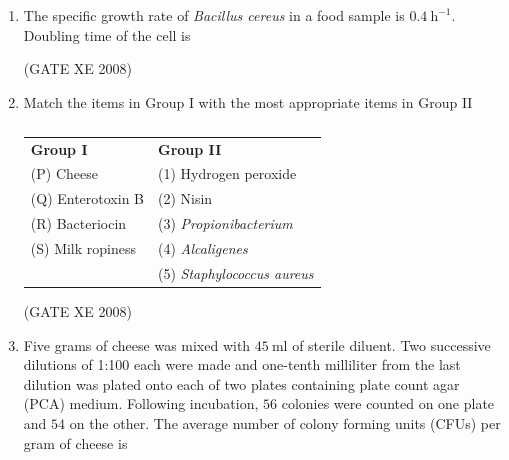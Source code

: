 \documentclass[12pt]{article}
\begin{document}
\begin{enumerate}
(GATE XE 2008)

\item The specific growth rate of \textit{Bacillus cereus} in a food sample is $0.4\ \mathrm{h}^{-1}$. Doubling time of the cell is  

\begin{enumerate}
\end{enumerate}

(GATE XE 2008)

\item Match the items in Group I with the most appropriate items in Group II
 
\begin{table}[H]     \centering     \caption{}     \label{}     \begin{tabular}{l l}

\textbf{Group I} & \textbf{Group II} \\
(P) Cheese & (1) Hydrogen peroxide \\
(Q) Enterotoxin B & (2) Nisin \\
(R) Bacteriocin & (3) \textit{Propionibacterium} \\
(S) Milk ropiness & (4) \textit{Alcaligenes} \\
 & (5) \textit{Staphylococcus aureus} \\
\end{tabular} \end{table}  

\begin{enumerate}
\end{enumerate}

(GATE XE 2008)

\item Five grams of cheese was mixed with $45\ \mathrm{ml}$ of sterile diluent. Two successive dilutions of 1:100 each were made and one-tenth milliliter from the last dilution was plated onto each of two plates containing plate count agar (PCA) medium. Following incubation, $56$ colonies were counted on one plate and $54$ on the other. The average number of colony forming units (CFUs) per gram of cheese is


\end{enumerate}
\end{document}
